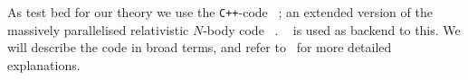 




















As test bed for our theory we use the \texttt{C++}-code \gwasevolution~\citep{christiansenAsevolutionRelativisticNbody2023}; an extended version of the massively parallelised relativistic $N$-body code \gevolution~\citep{adamekGevolutionCosmologicalNbody2016}. \latfield~\citep{daverioLatfield2LibraryClassical2016} is used as backend to this. %
We will describe the code in broad terms, and refer to~\citet{christiansenAsevolutionRelativisticNbody2023,christiansenAsimulationDomainFormation2024,adamekGevolutionCosmologicalNbody2016,daverioLatfield2LibraryClassical2016} for more detailed explanations.


